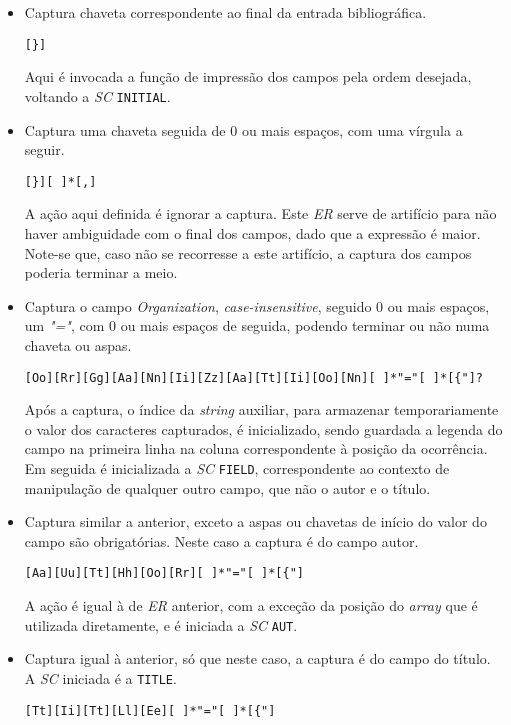 \begin{itemize}
\item Captura chaveta correspondente ao final da entrada bibliográfica.

\begin{verbatim}
[}] 
\end{verbatim}
Aqui é invocada a função de impressão dos campos pela ordem desejada, voltando
a \emph{SC} \texttt{INITIAL}.
\item Captura uma chaveta seguida de 0 ou mais espaços, com uma vírgula
	a seguir.

\begin{verbatim}
[}][ ]*[,]  
\end{verbatim}

A ação aqui definida é ignorar a captura. Este \emph{ER} serve de artifício
para não haver ambiguidade com o final dos campos, dado que a expressão
é maior. Note-se que, caso não se recorresse a este artifício, a captura dos
campos poderia terminar a meio.

\item Captura o campo \emph{Organization}, \emph{case-insensitive}, seguido 0 ou
	mais espaços, um \emph{"="}, com 0 ou mais espaços de seguida, podendo terminar
	ou não numa chaveta ou aspas.
\begin{verbatim}
[Oo][Rr][Gg][Aa][Nn][Ii][Zz][Aa][Tt][Ii][Oo][Nn][ ]*"="[ ]*[{"]? 
\end{verbatim}

Após a captura, o índice da \emph{string} auxiliar,  para armazenar
temporariamente o valor dos caracteres capturados, é inicializado, sendo guardada
a legenda do campo na primeira linha na coluna correspondente à posição da
ocorrência. Em seguida é inicializada a \emph{SC} \texttt{FIELD}, correspondente
ao contexto de manipulação de qualquer outro campo, que não o autor e o título.
                            
\item Captura similar a anterior, exceto a aspas ou chavetas de início do valor
	do campo são obrigatórias. Neste caso a captura é do campo autor.
\begin{verbatim}
[Aa][Uu][Tt][Hh][Oo][Rr][ ]*"="[ ]*[{"] 
\end{verbatim}

A ação é igual à de \emph{ER} anterior, com a exceção da posição do
\emph{array} que é utilizada diretamente, e é iniciada a \emph{SC} \texttt{AUT}.



\item Captura igual à anterior, só que neste caso, a captura é do campo do
	título. A \emph{SC} iniciada é a \texttt{TITLE}.
\begin{verbatim}
[Tt][Ii][Tt][Ll][Ee][ ]*"="[ ]*[{"] 
\end{verbatim}


\end{itemize}
